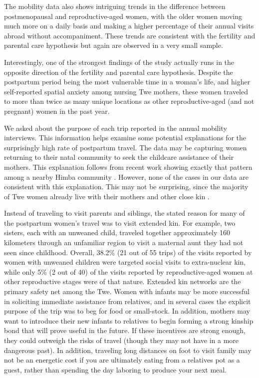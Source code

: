 The mobility data also shows intriguing trends in the difference between postmenopausal and reproductive-aged women, with the older women moving much more on a daily basis and making a higher percentage of their annual visits abroad without accompaniment.  These trends are consistent with the fertility and parental care hypothesis but again are observed in a very small sample.

Interestingly, one of the strongest findings of the study actually runs in the opposite direction of the fertility and parental care hypothesis.  Despite the postpartum period being the most vulnerable time in a woman's life, and higher self-reported spatial anxiety among nursing Twe mothers, these women traveled to more than twice as many unique locations as other reproductive-aged (and not pregnant) women in the past year. 

We asked about the purpose of each trip reported in the annual mobility interviews.  This information helps examine some potential explanations for the surprisingly high rate of postpartum travel.  The data may be capturing women returning to their natal community to seek the childcare assistance of their mothers.  This explanation follows from recent work showing exactly that pattern among a nearby Himba community  \citep{scelza2011female}.  However, none of the cases in our data are consistent with this explanation.  This may not be surprising, since the majority of Twe women already live with their mothers and other close kin \citep{vashro2014residence}.  

Instead of traveling to visit parents and siblings, the stated reason for many of the postpartum women's travel was to visit extended kin.  For example, two sisters, each with an unweaned child, traveled together approximately 160 kilometers through an unfamiliar region to visit a maternal aunt they had not seen since childhood.  Overall, 38.2\% (21 out of 55 trips) of the visits reported by women with unweaned children were targeted social visits to extra-nuclear kin, while only 5\% (2 out of 40) of the visits reported by reproductive-aged women at other reproductive stages were of that nature.  Extended kin networks are the primary safety net among the Twe.  Women with infants may be more successful in soliciting immediate assistance from relatives, and in several cases the explicit purpose of the trip was to beg for food or small-stock.  In addition, mothers may want to introduce their new infants to relatives to begin forming a strong kinship bond that will prove useful in the future.  If these incentives are strong enough, they could outweigh the risks of travel (though they may not have in a more dangerous past).  In addition, traveling long distances on foot to visit family may not be an energetic cost if you are ultimately eating from a relatives pot as a guest, rather than spending the day laboring to produce your next meal.


